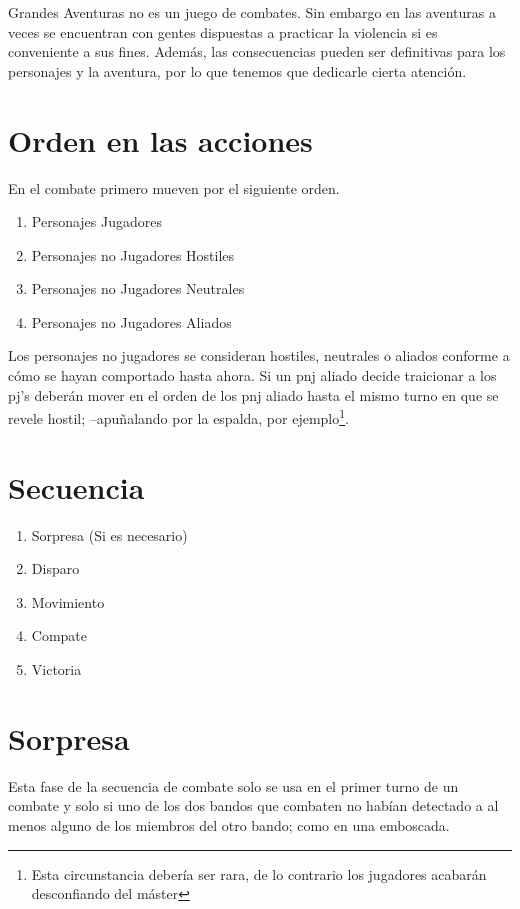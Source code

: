 
Grandes Aventuras no es un juego de combates. Sin embargo en las
aventuras a veces se encuentran con gentes dispuestas a practicar
la violencia si es conveniente a sus fines. Además, las consecuencias
pueden ser definitivas para los personajes y la aventura, por lo que
tenemos que dedicarle cierta atención.

\section{Orden en las acciones}

En el combate primero mueven por el siguiente orden.

\begin{enumerate}
\item Personajes Jugadores
\item Personajes no Jugadores Hostiles
\item Personajes no Jugadores Neutrales
\item Personajes no Jugadores Aliados
\end{enumerate}

Los personajes no jugadores se consideran hostiles, neutrales o aliados conforme 
a cómo se hayan comportado hasta ahora. Si un pnj aliado decide traicionar a los pj's
deberán mover en el orden de los pnj aliado hasta el mismo turno en que se revele 
hostil; --apuñalando por la espalda, por ejemplo\footnote{Esta circunstancia debería ser
rara, de lo contrario los jugadores acabarán desconfiando del máster}.

\section{Secuencia}

\begin{enumerate}
\item Sorpresa (Si es necesario)
\item Disparo
\item Movimiento
\item Compate
\item Victoria
\end{enumerate}

\section{Sorpresa}

Esta fase de la secuencia de combate solo se usa en el primer turno de un
combate y solo si uno de los dos bandos que combaten no habían detectado
a al menos alguno de los miembros del otro bando; como en una emboscada.

